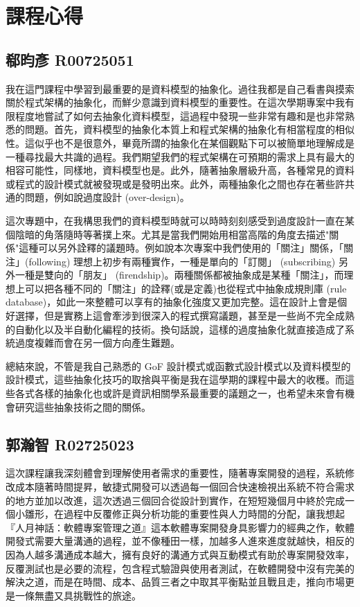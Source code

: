 \section{課程心得}
\subsection*{郗昀彥 R00725051}

我在這門課程中學習到最重要的是資料模型的抽象化。過往我都是自己看書與摸索關於程式架構的抽象化，而鮮少意識到資料模型的重要性。在這次學期專案中我有限程度地嘗試了如何去抽象化資料模型，這過程中發現一些非常有趣和是也非常熟悉的問題。首先，資料模型的抽象化本質上和程式架構的抽象化有相當程度的相似性。這似乎也不是很意外，畢竟所謂的抽象化在某個觀點下可以被簡單地理解成是一種尋找最大共識的過程。我們期望我們的程式架構在可預期的需求上具有最大的相容可能性，同樣地，資料模型也是。此外，隨著抽象層級升高，各種常見的資料或程式的設計模式就被發現或是發明出來。此外，兩種抽象化之間也存在著些許共通的問題，例如說過度設計 (over-design)。

這次專題中，在我構思我們的資料模型時就可以時時刻刻感受到過度設計一直在某個陰暗的角落隨時等著撲上來。尤其是當我們開始用相當高階的角度去描述"關係"這種可以另外詮釋的議題時。例如說本次專案中我們使用的「關注」關係，「關注」(following) 理想上初步有兩種實作，一種是單向的「訂閱」 (subscribing) 另外一種是雙向的「朋友」 (firendship)。兩種關係都被抽象成是某種「關注」，而理想上可以把各種不同的「關注」的詮釋(或是定義)也從程式中抽象成規則庫 (rule database)，如此一來整體可以享有的抽象化強度又更加完整。這在設計上會是個好選擇，但是實務上這會牽涉到很深入的程式撰寫議題，甚至是一些尚不完全成熟的自動化以及半自動化編程的技術。換句話說，這樣的過度抽象化就直接造成了系統過度複雜而會在另一個方向產生難題。

總結來說，不管是我自己熟悉的 GoF 設計模式或函數式設計模式以及資料模型的設計模式，這些抽象化技巧的取捨與平衡是我在這學期的課程中最大的收穫。而這些各式各樣的抽象化也或許是資訊相關學系最重要的議題之一，也希望未來會有機會研究這些抽象技術之間的關係。

\subsection*{郭瀚智 R02725023}

這次課程讓我深刻體會到理解使用者需求的重要性，隨著專案開發的過程，系統修改成本隨著時間提昇，敏捷式開發可以透過每一個回合快速檢視出系統不符合需求的地方並加以改進，這次透過三個回合從設計到實作，在短短幾個月中終於完成一個小雛形，在過程中反覆修正與分析功能的重要性與人力時間的分配，讓我想起『人月神話：軟體專案管理之道』這本軟體專案開發身具影響力的經典之作，軟體開發式需要大量溝通的過程，並不像種田一樣，加越多人進來進度就越快，相反的因為人越多溝通成本越大，擁有良好的溝通方式與互動模式有助於專案開發效率，反覆測試也是必要的流程，包含程式驗證與使用者測試，在軟體開發中沒有完美的解決之道，而是在時間、成本、品質三者之中取其平衡點並且戰且走，推向市場更是一條無盡又具挑戰性的旅途。

